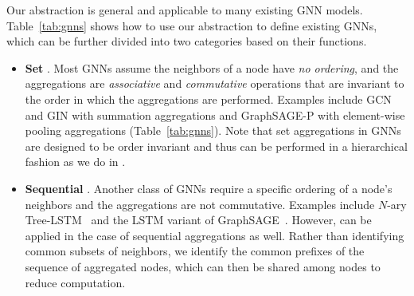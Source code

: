 Our \xg abstraction is general and applicable to many existing GNN models.
Table~\ref{tab:gnns} shows how to use our abstraction to define existing GNNs, which can be further divided into two categories based on their  functions.

\begin{itemize}
\setlength\itemsep{0em}
\item {\bf Set }. Most GNNs assume the neighbors of a node have {\em no ordering}, and the aggregations are {\em associative} and {\em commutative} operations that are invariant to the order in which the aggregations are performed. Examples include GCN and GIN with summation aggregations and GraphSAGE-P with element-wise pooling aggregations (Table~\ref{tab:gnns}).
Note that set aggregations in GNNs are designed to be order invariant and thus can be performed in a hierarchical fashion as we do in \xgs.
\hide{
}

\item {\bf Sequential }. Another class of GNNs require a specific ordering of a node's neighbors and the aggregations are not commutative. 
Examples include $N$-ary Tree-LSTM~\cite{TreeLSTM} and the LSTM variant of GraphSAGE~\cite{GraphSAGE}.
However, \xgs can be applied in the case of sequential aggregations as well. 
Rather than identifying common subsets of neighbors, we identify the common prefixes of the sequence of aggregated nodes, which can then be shared among nodes to reduce computation.
\end{itemize}

